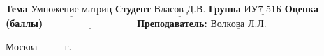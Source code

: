 \begin{titlepage}
      \noindent\textbf{Тема} $\underline{\text{Умножение матриц}}$\newline\newline
      \noindent\textbf{Студент} $\underline{\text{Власов Д.В.}}$\newline\newline
      \noindent\textbf{Группа} $\underline{\text{ИУ7-51Б}}$\newline\newline
      \noindent\textbf{Оценка (баллы)} $\underline{\text{~~~~~~~~~~~~~~~~~~~~~~~~~~~}}$\newline\newline
      \noindent\textbf{Преподаватель: } $\underline{\text{Волкова Л.Л.}}$\newline\newline\newline
      
      \begin{center}
          \vfill
          Москва~---~\the\year
          ~г.
      \end{center}
  \end{titlepage}
  